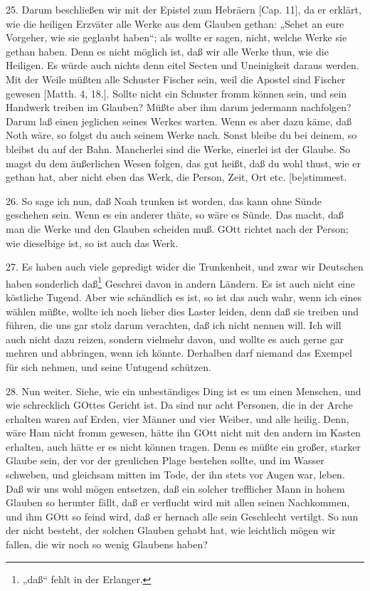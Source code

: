 25. Darum beschließen wir mit der Epistel zum Hebräern [Cap. 11], da er erklärt, wie die heiligen Erzväter alle Werke aus dem Glauben gethan: „Sehet an eure Vorgeher, wie sie geglaubt haben“; als wollte er sagen, nicht, welche Werke sie gethan haben. Denn es nicht möglich ist, daß wir alle Werke thun, wie die Heiligen. Es würde auch nichts denn eitel Secten und Uneinigkeit daraus werden. Mit der Weile müßten alle Schuster Fischer sein, weil die Apostel sind Fischer gewesen [Matth. 4, 18.]. Sollte nicht ein Schuster fromm können sein, und sein Handwerk treiben im Glauben? Müßte aber ihm darum jedermann nachfolgen? Darum laß einen jeglichen seines Werkes warten. Wenn es aber dazu käme, daß Noth wäre, so folgst du auch seinem Werke nach. Sonst bleibe du bei deinem, so bleibst du auf der Bahn. Mancherlei sind die Werke, einerlei ist der Glaube. So magst du dem äußerlichen Wesen folgen, das gut heißt, daß du wohl thust, wie er gethan hat, aber nicht eben das Werk, die Person, Zeit, Ort etc. [be]stimmest.

26. So sage ich nun, daß Noah trunken ist worden, das kann ohne Sünde geschehen sein. Wenn es ein anderer thäte, so wäre es Sünde. Das macht, daß man die Werke und den Glauben scheiden muß. GOtt richtet nach der Person; wie dieselbige ist, so ist auch das Werk.

27. Es haben auch viele gepredigt wider die
Trunkenheit, und zwar wir Deutschen haben sonderlich daß\footnote{„daß“ fehlt in der Erlanger.} Geschrei davon in andern Ländern. Es ist auch nicht eine köstliche Tugend. Aber wie schändlich es ist, so ist das auch wahr, wenn ich eines wählen müßte, wollte ich noch lieber dies Laster leiden, denn daß sie treiben und führen, die uns gar stolz darum verachten, daß ich nicht nennen will. Ich will auch nicht dazu reizen, sondern vielmehr davon, und wollte es auch gerne gar mehren und abbringen, wenn ich könnte. Derhalben darf niemand das Exempel für sich nehmen, und seine Untugend schützen.

28. Nun weiter. Siehe, wie ein unbeständiges Ding ist es um einen Menschen, und wie schrecklich GOttes Gericht ist. Da sind nur acht Personen, die in der Arche erhalten waren auf Erden, vier Männer und vier Weiber, und alle heilig. Denn, wäre Ham nicht fromm gewesen, hätte ihn GOtt nicht mit den andern im Kasten erhalten, auch hätte er es nicht können tragen. Denn es müßte ein großer, starker Glaube sein, der vor der greulichen Plage bestehen sollte, und im Wasser schweben, und gleichsam mitten im Tode, der ihn stets vor Augen war, leben. Daß wir uns wohl mögen entsetzen, daß ein solcher trefflicher Mann in hohem Glauben so herunter fällt, daß er verflucht wird mit allen seinen Nachkommen, und ihm GOtt so feind wird, daß er hernach alle sein Geschlecht vertilgt. So nun der nicht besteht, der solchen Glauben gehabt hat, wie leichtlich mögen wir fallen, die wir noch so wenig Glaubens haben?

